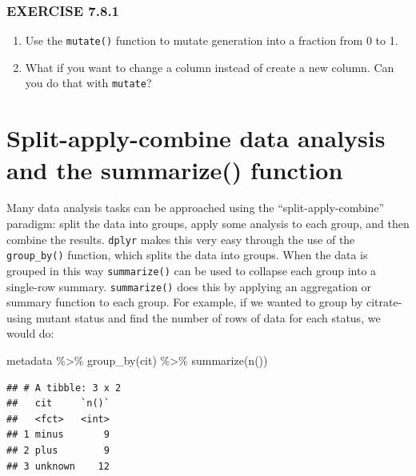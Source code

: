 \documentclass[
]{book}
\newenvironment{Shaded}{\begin{snugshade}}{\end{snugshade}}
\newcommand{\FunctionTok}[1]{\textcolor[rgb]{0.00,0.00,0.00}{#1}}
\newcommand{\NormalTok}[1]{#1}
\newcommand{\SpecialCharTok}[1]{\textcolor[rgb]{0.00,0.00,0.00}{#1}}
\begin{document}
\hypertarget{exercise-7.8.1}{%
\subsubsection*{EXERCISE 7.8.1}\label{exercise-7.8.1}}

\begin{enumerate}
\def\labelenumi{\arabic{enumi}.}
\item
  Use the \texttt{mutate()} function to mutate generation into a fraction from 0 to 1.
\item
  What if you want to change a column instead of create a new column. Can you do that with \texttt{mutate}?
\end{enumerate}

\hypertarget{split-apply-combine-data-analysis-and-the-summarize-function}{%
\section{Split-apply-combine data analysis and the summarize() function}\label{split-apply-combine-data-analysis-and-the-summarize-function}}

Many data analysis tasks can be approached using the ``split-apply-combine'' paradigm: split the data into groups, apply some analysis to each group, and then combine the results. \texttt{dplyr} makes this very easy through the use of the \texttt{group\_by()} function, which splits the data into groups. When the data is grouped in this way \texttt{summarize()} can be used to collapse each group into a single-row summary. \texttt{summarize()} does this by applying an aggregation or summary function to each group. For example, if we wanted to group by citrate-using mutant status and find the number of rows of data for each status, we would do:

\begin{Shaded}
\begin{Highlighting}[]
\NormalTok{metadata }\SpecialCharTok{\%\textgreater{}\%}
  \FunctionTok{group\_by}\NormalTok{(cit) }\SpecialCharTok{\%\textgreater{}\%}
  \FunctionTok{summarize}\NormalTok{(}\FunctionTok{n}\NormalTok{())}
\end{Highlighting}
\end{Shaded}

\begin{verbatim}
## # A tibble: 3 x 2
##   cit     `n()`
##   <fct>   <int>
## 1 minus       9
## 2 plus        9
## 3 unknown    12
\end{verbatim}
\end{document}
